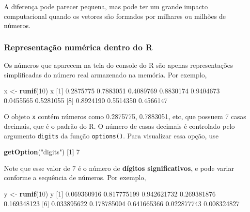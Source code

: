\documentclass[10pt,a4paper]{book}
\newenvironment{Shaded}{\begin{snugshade}}{\end{snugshade}}
\newcommand{\KeywordTok}[1]{\textcolor[rgb]{0.13,0.29,0.53}{\textbf{#1}}}
\newcommand{\DecValTok}[1]{\textcolor[rgb]{0.00,0.00,0.81}{#1}}
\newcommand{\FloatTok}[1]{\textcolor[rgb]{0.00,0.00,0.81}{#1}}
\newcommand{\StringTok}[1]{\textcolor[rgb]{0.31,0.60,0.02}{#1}}
\newcommand{\NormalTok}[1]{#1}
\begin{document}
A diferença pode parecer pequena, mas pode ter um grande impacto
computacional quando os vetores são formados por milhares ou milhões de
números.

\subsubsection{Representação numérica dentro do
R}\label{representauxe7uxe3o-numuxe9rica-dentro-do-r}

Os números que aparecem na tela do console do R são apenas
representações simplificadas do número real armazenado na memória. Por
exemplo,

\begin{Shaded}
\begin{Highlighting}[]
\NormalTok{x <-}\StringTok{ }\KeywordTok{runif}\NormalTok{(}\DecValTok{10}\NormalTok{)}
\NormalTok{x}
\NormalTok{ [}\DecValTok{1}\NormalTok{] }\FloatTok{0.2875775} \FloatTok{0.7883051} \FloatTok{0.4089769} \FloatTok{0.8830174} \FloatTok{0.9404673} \FloatTok{0.0455565} \FloatTok{0.5281055}
\NormalTok{ [}\DecValTok{8}\NormalTok{] }\FloatTok{0.8924190} \FloatTok{0.5514350} \FloatTok{0.4566147}
\end{Highlighting}
\end{Shaded}

O objeto \texttt{x} contém números como 0.2875775, 0.7883051, etc, que
possuem 7 casas decimais, que é o padrão do R. O número de casas
decimais é controlado pelo argumento \texttt{digits} da função
\texttt{options()}. Para visualizar essa opção, use

\begin{Shaded}
\begin{Highlighting}[]
\KeywordTok{getOption}\NormalTok{(}\StringTok{"digits"}\NormalTok{)}
\NormalTok{[}\DecValTok{1}\NormalTok{] }\DecValTok{7}
\end{Highlighting}
\end{Shaded}

Note que esse valor de 7 é o número de \textbf{dígitos significativos},
e pode variar conforme a sequência de números. Por exemplo,

\begin{Shaded}
\begin{Highlighting}[]
\NormalTok{y <-}\StringTok{ }\KeywordTok{runif}\NormalTok{(}\DecValTok{10}\NormalTok{)}
\NormalTok{y}
\NormalTok{ [}\DecValTok{1}\NormalTok{] }\FloatTok{0.069360916} \FloatTok{0.817775199} \FloatTok{0.942621732} \FloatTok{0.269381876} \FloatTok{0.169348123}
\NormalTok{ [}\DecValTok{6}\NormalTok{] }\FloatTok{0.033895622} \FloatTok{0.178785004} \FloatTok{0.641665366} \FloatTok{0.022877743} \FloatTok{0.008324827}
\end{Highlighting}
\end{Shaded}
\end{document}
